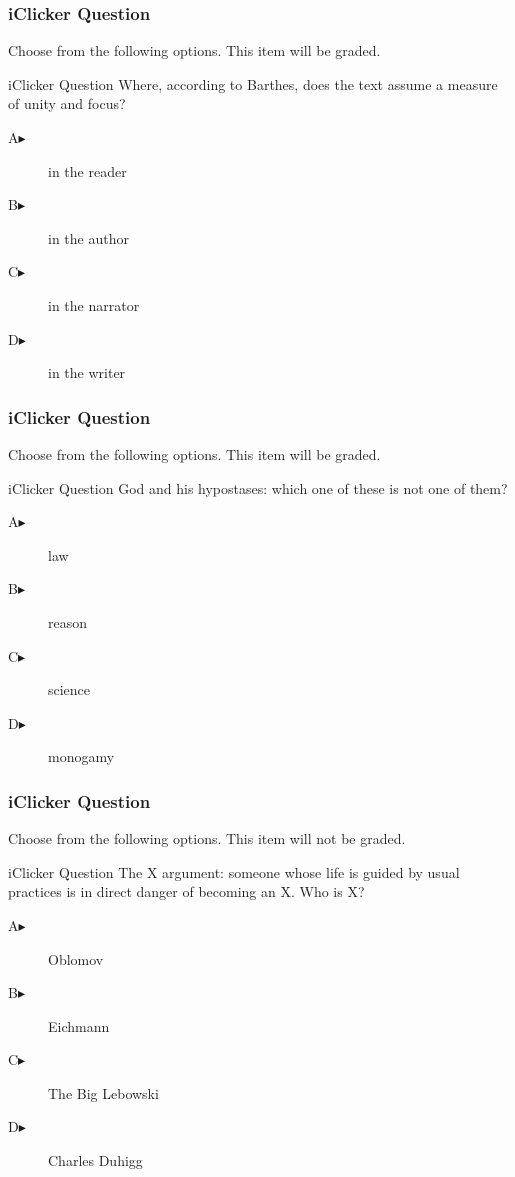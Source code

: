 \documentclass[xcolor=dvipsnames]{beamer}
\begin{document}
\begin{frame}
  \frametitle{iClicker Question}
Choose from the following options. This item will be graded.
\begin{block}{iClicker Question}
Where, according to Barthes, does the text assume a measure of unity
and focus?
\end{block}
\begin{description}
\item[A\hspace{.2in}$\blacktriangleright$] in the reader
\item[B\hspace{.2in}$\blacktriangleright$] in the author
\item[C\hspace{.2in}$\blacktriangleright$] in the narrator
\item[D\hspace{.2in}$\blacktriangleright$] in the writer
\end{description}
\end{frame}

\begin{frame}
  \frametitle{iClicker Question}
Choose from the following options. This item will be graded.
\begin{block}{iClicker Question}
God and his hypostases: which one of these is not one of them?
\end{block}
\begin{description}
\item[A\hspace{.2in}$\blacktriangleright$] law
\item[B\hspace{.2in}$\blacktriangleright$] reason
\item[C\hspace{.2in}$\blacktriangleright$] science
\item[D\hspace{.2in}$\blacktriangleright$] monogamy
\end{description}
\end{frame}

\begin{frame}
  \frametitle{iClicker Question}
Choose from the following options. This item will not be graded.
\begin{block}{iClicker Question}
The X argument: someone whose life is guided by usual practices is in
direct danger of becoming an X. Who is X?
\end{block}
\begin{description}
\item[A\hspace{.2in}$\blacktriangleright$] Oblomov
\item[B\hspace{.2in}$\blacktriangleright$] Eichmann
\item[C\hspace{.2in}$\blacktriangleright$] The Big Lebowski
\item[D\hspace{.2in}$\blacktriangleright$] Charles Duhigg
\end{description}
\end{frame}
\end{document}
